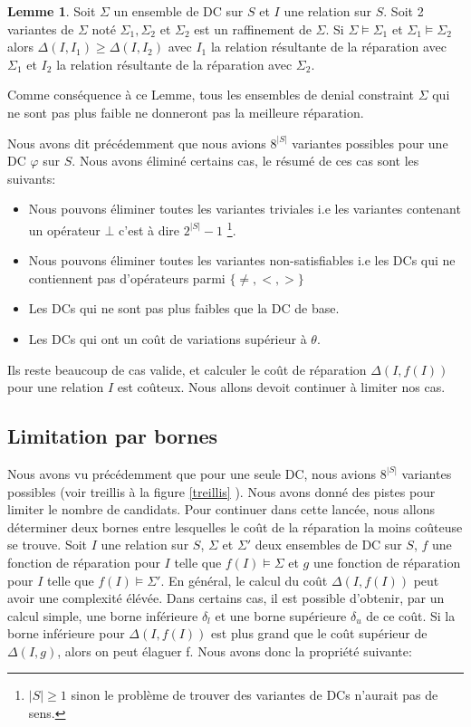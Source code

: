 \documentclass[letterpaper, 12pt]{report}
\theoremstyle{definition}
\newtheorem{mylemma}{Lemme}
\begin{document}
\begin{mylemma}
 Soit $\Sigma$ un ensemble de DC sur $S$ et $I$ une relation sur $S$. Soit 2 variantes de $\Sigma$ noté $\Sigma_1,\Sigma_2$ et $\Sigma_2$ est un raffinement de $\Sigma$. Si $\Sigma \models \Sigma_1$ et $\Sigma_1 \models \Sigma_2$ alors $\Delta(I,I_1) \geq \Delta(I,I_2)$ avec $I_1$ la relation résultante de la réparation avec $\Sigma_1$ et $I_2$ la relation résultante de la réparation avec $\Sigma_2$.
\end{mylemma}

Comme conséquence à ce Lemme, tous les ensembles de denial constraint $\Sigma$ qui ne sont pas plus faible ne donneront pas la meilleure réparation.

Nous avons dit précédemment que nous avions $8^{|S|}$ variantes possibles pour une DC $\varphi$ sur $S$. Nous avons éliminé certains cas, le résumé de ces cas sont les suivants:
\begin{itemize}
\item Nous pouvons éliminer toutes les variantes triviales i.e les variantes contenant un opérateur $\bot$ c'est à dire $2^{|S|}-1$ \footnote{$|S| \geq 1$ sinon le problème de trouver des variantes de DCs n'aurait pas de sens. }.
\item Nous pouvons éliminer toutes les variantes non-satisfiables i.e les DCs qui ne contiennent pas d'opérateurs parmi $\{\neq,<,> \}$
\item Les DCs qui ne sont pas plus faibles que la DC de base.
\item Les DCs qui ont un coût de variations supérieur à $\theta$.
\end{itemize}

Ils reste beaucoup de cas valide, et calculer le coût de réparation $\Delta(I,f(I))$ pour une relation $I$ est coûteux. Nous allons devoit continuer à limiter nos cas.

\subsection{Limitation par bornes}

Nous avons vu précédemment que pour une seule DC, nous avions $8^{|S|}$ variantes possibles (voir treillis à la figure \ref{treillis} ). Nous avons donné des pistes pour limiter le nombre de candidats. Pour continuer dans cette lancée, nous allons déterminer deux bornes entre lesquelles le coût de la réparation la moins coûteuse se trouve. Soit $I$ une relation sur $S$, $\Sigma$ et $\Sigma'$ deux ensembles de DC sur $S$, $f$ une fonction de réparation pour $I$ telle que $f(I)\models \Sigma$ et  $g$ une fonction de réparation pour $I$ telle que $f(I)\models \Sigma'$. En général, le calcul du coût $\Delta(I,f(I))$ peut avoir une complexité élévée. Dans certains cas, il est possible d'obtenir, par un calcul simple,  une borne inférieure $\delta_l$ et une borne supérieure $\delta_u$ de ce coût.  Si la borne inférieure pour $\Delta(I,f(I))$ est plus grand que le coût supérieur de $\Delta(I,g)$, alors on peut élaguer f. Nous avons donc la propriété suivante:
\end{document}
